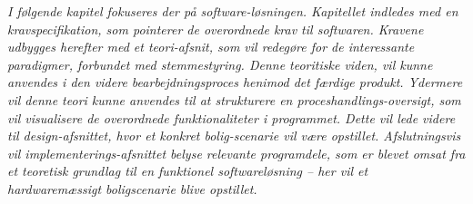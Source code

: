 \textit{I følgende kapitel fokuseres der på software-løsningen. Kapitellet indledes med en kravspecifikation, som pointerer de overordnede krav til softwaren. Kravene udbygges herefter med et teori-afsnit, som vil redegøre for de interessante paradigmer, forbundet med stemmestyring. Denne teoritiske viden, vil kunne anvendes i den videre bearbejdningsproces henimod det færdige produkt. Ydermere vil denne teori kunne anvendes til at strukturere en proceshandlings-oversigt, som vil visualisere de overordnede funktionaliteter i programmet. Dette vil lede videre til design-afsnittet, hvor et konkret bolig-scenarie vil være opstillet. Afslutningsvis vil implementerings-afsnittet belyse relevante programdele, som er blevet omsat fra et teoretisk grundlag til en funktionel softwareløsning – her vil et hardwaremæssigt boligscenarie blive opstillet.}
